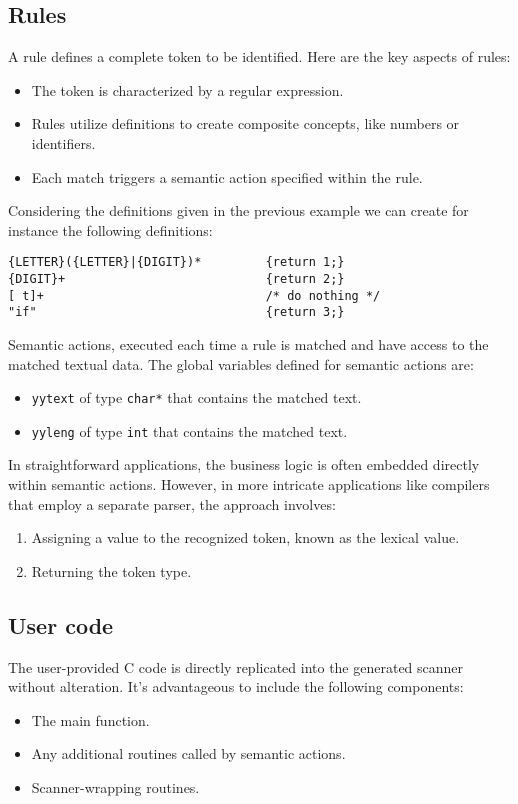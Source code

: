 \subsection{Rules}
A rule defines a complete token to be identified. Here are the key aspects of rules:
\begin{itemize}
    \item The token is characterized by a regular expression.
    \item Rules utilize definitions to create composite concepts, like numbers or identifiers.
    \item Each match triggers a semantic action specified within the rule.
\end{itemize}
\begin{example}
    Considering the definitions given in the previous example we can create for instance the following definitions:  \\
    \begin{lstlisting}[style=C]
{LETTER}({LETTER}|{DIGIT})*         {return 1;}
{DIGIT}+                            {return 2;}
[ t]+                               /* do nothing */
"if"                                {return 3;}
    \end{lstlisting}
\end{example}
Semantic actions, executed each time a rule is matched and have access to the matched textual data.
The global variables defined for semantic actions are: 
\begin{itemize}
    \item \texttt{yytext} of type \texttt{char*} that contains the matched text. 
    \item \texttt{yyleng} of type \texttt{int} that contains the matched text. 
\end{itemize}

In straightforward applications, the business logic is often embedded directly within semantic actions.
However, in more intricate applications like compilers that employ a separate parser, the approach involves:
\begin{enumerate}
    \item Assigning a value to the recognized token, known as the lexical value.
    \item Returning the token type.
\end{enumerate}

\subsection{User code}
The user-provided C code is directly replicated into the generated scanner without alteration. 
It's advantageous to include the following components:
\begin{itemize}
    \item The main function.
    \item Any additional routines called by semantic actions.
    \item Scanner-wrapping routines.
\end{itemize}

